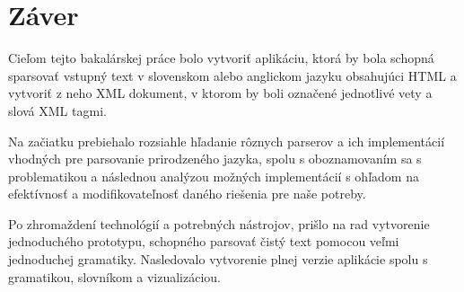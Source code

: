 \documentclass[12pt,a4paper]{report}
\theoremstyle{definition}
\theoremstyle{remark}
\begin{document}
%
%
%

\chapter{Záver}
Cieľom tejto bakalárskej práce bolo vytvoriť aplikáciu, ktorá by bola schopná sparsovať vstupný text v slovenskom alebo anglickom jazyku obsahujúci HTML a vytvoriť z neho XML dokument, v ktorom by boli označené jednotlivé vety a slová XML tagmi.

Na začiatku prebiehalo rozsiahle hľadanie rôznych parserov a ich implementácií vhodných pre parsovanie prirodzeného jazyka, spolu s oboznamovaním sa s problematikou a následnou analýzou možných implementácií s ohľadom na efektívnosť a modifikovateľnosť daného riešenia pre naše potreby.

Po zhromaždení technológií a potrebných nástrojov, prišlo na rad vytvorenie jednoduchého prototypu, schopného parsovať čistý text pomocou veľmi jednoduchej gramatiky. Nasledovalo vytvorenie plnej verzie aplikácie spolu s gramatikou, slovníkom a vizualizáciou. 
\end{document}
